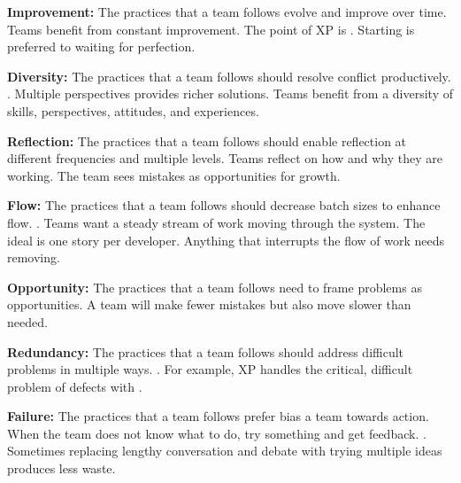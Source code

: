 \textbf{Improvement:} The practices that a team follows evolve and improve over time. Teams benefit from constant improvement. The point of XP is  \cite{BeckExtremeProgramming2004}. Starting is preferred to waiting for perfection. 

\textbf{Diversity:} The practices that a team follows should resolve conflict productively.   \cite{BeckExtremeProgramming2004}. Multiple perspectives provides richer solutions. Teams benefit from a diversity of skills, perspectives, attitudes, and experiences.

\textbf{Reflection:} The practices that a team follows should enable reflection at different frequencies and multiple levels. Teams reflect on how and why they are working. The team sees mistakes as opportunities for growth.

\textbf{Flow:} The practices that a team follows should decrease batch sizes to enhance flow.   \cite{BeckExtremeProgramming2004}. Teams want a steady stream of work moving through the system. The ideal  is one story per developer. Anything that interrupts the flow of work needs removing. 

\textbf{Opportunity:} The practices that a team follows need to frame problems as opportunities. A team  will make fewer mistakes but also move slower than needed.

\textbf{Redundancy:} The practices that a team follows should address difficult problems in multiple ways.  \cite{BeckExtremeProgramming2004}. For example, XP handles the critical, difficult problem of defects with   \cite{BeckExtremeProgramming2004}. 


\textbf{Failure:} The practices that a team follows prefer bias a team towards action. When the team does not know what to do, try something and get feedback.  \cite{BeckExtremeProgramming2004}. Sometimes replacing lengthy conversation and debate with trying multiple ideas produces less waste.

